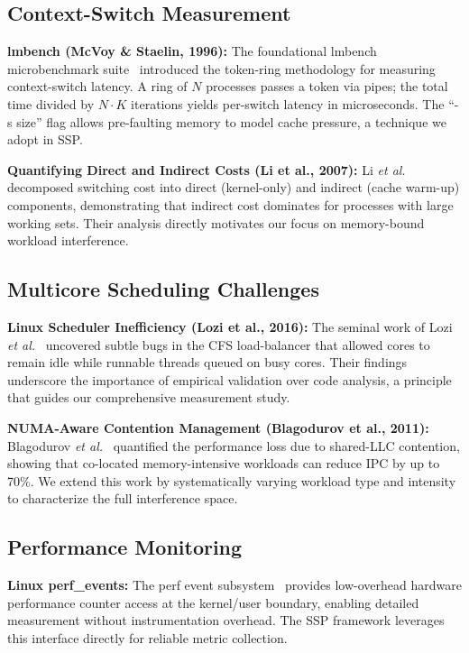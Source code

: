 \documentclass[conference]{IEEEtran}
\begin{document}
\subsection{Context-Switch Measurement}

\textbf{lmbench (McVoy \& Staelin, 1996):} The foundational lmbench
microbenchmark suite~\cite{mcvoy1996lmbench} introduced the token-ring
methodology for measuring context-switch latency. A ring of $N$ processes
passes a token via pipes; the total time divided by $N \cdot K$ iterations
yields per-switch latency in microseconds. The ``-s size'' flag allows
pre-faulting memory to model cache pressure, a technique we adopt in SSP.

\textbf{Quantifying Direct and Indirect Costs (Li et al., 2007):} Li
\textit{et al.}~\cite{li2007quantifying} decomposed switching cost into direct
(kernel-only) and indirect (cache warm-up) components, demonstrating that
indirect cost dominates for processes with large working sets. Their analysis
directly motivates our focus on memory-bound workload interference.

\subsection{Multicore Scheduling Challenges}

\textbf{Linux Scheduler Inefficiency (Lozi et al., 2016):} The seminal work of
Lozi \textit{et al.}~\cite{lozi2016linux} uncovered subtle bugs in the CFS
load-balancer that allowed cores to remain idle while runnable threads queued
on busy cores. Their findings underscore the importance of empirical validation
over code analysis, a principle that guides our comprehensive measurement study.

\textbf{NUMA-Aware Contention Management (Blagodurov et al., 2011):} Blagodurov
\textit{et al.}~\cite{blagodurov2011numa} quantified the performance loss due to
shared-LLC contention, showing that co-located memory-intensive workloads can
reduce IPC by up to 70\%. We extend this work by systematically varying workload
type and intensity to characterize the full interference space.

\subsection{Performance Monitoring}

\textbf{Linux perf\_events:} The perf event subsystem~\cite{perf2010} provides
low-overhead hardware performance counter access at the kernel/user boundary,
enabling detailed measurement without instrumentation overhead. The SSP framework
leverages this interface directly for reliable metric collection.
\end{document}
